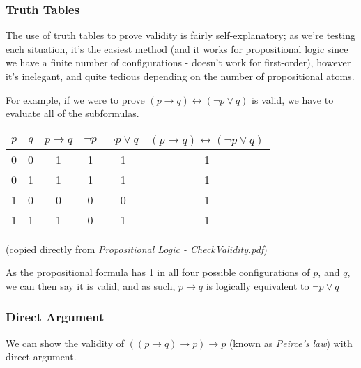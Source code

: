 \documentclass[a4paper, 12pt]{article}
\begin{document}
        \subsubsection*{Truth Tables}
        The use of truth tables to prove validity is fairly self-explanatory; as we're testing each situation, it's the easiest method (and it works for propositional logic since we have a finite number of configurations - doesn't work for first-order), however it's inelegant, and quite tedious depending on the number of propositional atoms.
        \medskip

        For example, if we were to prove $(p \rightarrow q) \leftrightarrow (\neg p \lor q)$ is valid, we have to evaluate all of the subformulas.
        \begin{center}
            \begin{tabular}{||c|c||c||c|c||c||}
                \hline
                $p$ & $q$ & $p \rightarrow q$ & $\neg p$ & $\neg p \lor q$ & $(p \rightarrow q) \leftrightarrow (\neg p \lor q)$ \\
                \hline
                0 & 0 & 1 & 1 & 1 & 1 \\
                0 & 1 & 1 & 1 & 1 & 1 \\
                1 & 0 & 0 & 0 & 0 & 1 \\
                1 & 1 & 1 & 0 & 1 & 1 \\
                \hline
            \end{tabular}
            \medskip

            (copied directly from \textit{Propositional Logic - CheckValidity.pdf})
        \end{center}
        As the propositional formula has 1 in all four possible configurations of $p$, and $q$, we can then say it is valid, and as such, $p \rightarrow q$ is logically equivalent to $\neg p \lor q$
        \subsubsection*{Direct Argument}
        We can show the validity of $((p \rightarrow q) \rightarrow p) \rightarrow p$ (known as \textit{Peirce's law}) with direct argument.
        \medskip
\end{document}
